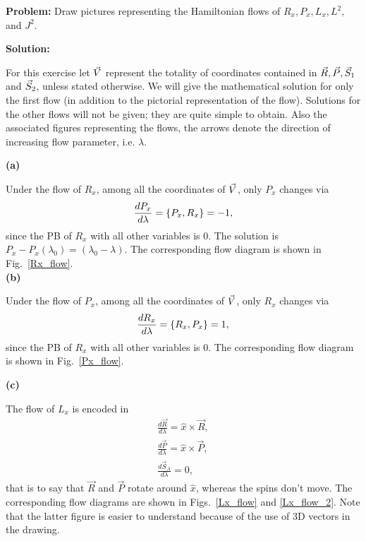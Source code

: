 \begin{Exercise}    \label{exercise-2}
\textbf{Problem:}  Draw pictures representing the Hamiltonian
flows of $R_x, P_x, L_x, L^2,$ and $J^2$.



\textbf{Solution:} 

For this exercise let $\vec{V}$ represent the totality of 
coordinates contained in $\vec{R}, \vec{P}, \vec{S}_1$ and $\vec{S}_2$,
unless stated otherwise.
We will give the mathematical
 solution for only the first flow (in addition to the
pictorial representation of the flow).
Solutions for the other flows will not be given; they are quite
simple to obtain.
Also the associated figures representing the flows,
the arrows denote the direction of
increasing flow parameter, i.e. $\lambda$.






\textbf{(a)}

Under the flow of $R_x$, among all the
coordinates of $\vec{V}$, only $P_x$ changes via
\begin{align}
\frac{d P_x}{d \lambda}  =  \left\lbrace P_x, R_x \right\rbrace = -1,
\end{align}
since the PB of $R_x$ with all other variables is 0. 
The solution is $ P_x - P_x(\lambda_0) = (\lambda_0 -  \lambda).$
The  corresponding flow diagram is shown in
Fig.~\ref{Rx_flow}.\\




\textbf{(b)}

Under the flow of $P_x$, among all the
coordinates of $\vec{V}$, only $R_x$ changes via
\begin{align}
\frac{d R_x}{d \lambda}  =  \left\lbrace R_x, P_x \right\rbrace = 1,
\end{align}
since the PB of $R_x$ with all other variables is 0. The 
corresponding flow diagram is shown in
Fig.~\ref{Px_flow}.





\textbf{(c)}

The flow of $L_x$ is encoded in 
\begin{align}
\frac{d \vec{R}}{d \lambda}=\hat{x} \times \vec{R},   \\
\frac{d \vec{P}}{d \lambda}=\hat{x} \times \vec{P},     \\
\frac{d \vec{S}_A}{d \lambda}=  0,   
\end{align}
that is to say that $\vec{R}$ and $\vec{P}$ rotate around $\hat{x}$,
whereas the spins don't move.
The  corresponding flow diagrams are shown in
Figs.~\ref{Lx_flow} and \ref{Lx_flow_2}. Note that the latter figure
is easier to understand because of the use of 3D vectors in the
drawing.







\end{Exercise}
